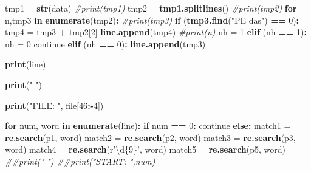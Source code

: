 \documentclass[
  12pt,
]{article}
\newenvironment{Shaded}{\begin{snugshade}}{\end{snugshade}}
\newcommand{\CommentTok}[1]{\textcolor[rgb]{0.56,0.35,0.01}{\textit{#1}}}
\newcommand{\ControlFlowTok}[1]{\textcolor[rgb]{0.13,0.29,0.53}{\textbf{#1}}}
\newcommand{\DecValTok}[1]{\textcolor[rgb]{0.00,0.00,0.81}{#1}}
\newcommand{\KeywordTok}[1]{\textcolor[rgb]{0.13,0.29,0.53}{\textbf{#1}}}
\newcommand{\NormalTok}[1]{#1}
\newcommand{\OperatorTok}[1]{\textcolor[rgb]{0.81,0.36,0.00}{\textbf{#1}}}
\newcommand{\StringTok}[1]{\textcolor[rgb]{0.31,0.60,0.02}{#1}}
\begin{document}
\begin{Shaded}
\begin{Highlighting}[]
\NormalTok{    tmp1 =}\StringTok{ }\KeywordTok{str}\NormalTok{(data)}
    \CommentTok{#print(tmp1)}
\NormalTok{    tmp2 =}\StringTok{ }\KeywordTok{tmp1.splitlines}\NormalTok{()}
    \CommentTok{#print(tmp2)}
    \ControlFlowTok{for}\NormalTok{ n,tmp3 }\ControlFlowTok{in} \KeywordTok{enumerate}\NormalTok{(tmp2)}\OperatorTok{:}
\StringTok{        }\CommentTok{#print(tmp3)}
\StringTok{        }\ControlFlowTok{if}\NormalTok{ (}\KeywordTok{tmp3.find}\NormalTok{(}\StringTok{"PE das"}\NormalTok{) }\OperatorTok{==}\StringTok{ }\DecValTok{0}\NormalTok{)}\OperatorTok{:}
\StringTok{            }\NormalTok{tmp4 =}\StringTok{ }\NormalTok{tmp3 }\OperatorTok{+}\StringTok{ }\NormalTok{tmp2[}\DecValTok{2}\NormalTok{]}
            \KeywordTok{line.append}\NormalTok{(tmp4)}
            \CommentTok{#print(n)}
\NormalTok{            nh =}\StringTok{ }\DecValTok{1}
        \KeywordTok{elif}\NormalTok{ (nh }\OperatorTok{==}\StringTok{ }\DecValTok{1}\NormalTok{)}\OperatorTok{:}
\StringTok{            }\NormalTok{nh =}\StringTok{ }\DecValTok{0}
\NormalTok{            continue}
        \KeywordTok{elif}\NormalTok{ (nh }\OperatorTok{==}\StringTok{ }\DecValTok{0}\NormalTok{)}\OperatorTok{:}
\StringTok{            }\KeywordTok{line.append}\NormalTok{(tmp3)}

    \KeywordTok{print}\NormalTok{(line)}

    \KeywordTok{print}\NormalTok{(}\StringTok{"   "}\NormalTok{)}
    
    \KeywordTok{print}\NormalTok{(}\StringTok{"FILE: "}\NormalTok{, file[}\DecValTok{46}\OperatorTok{:-}\DecValTok{4}\NormalTok{])}

    \ControlFlowTok{for}\NormalTok{ num, word }\ControlFlowTok{in} \KeywordTok{enumerate}\NormalTok{(line)}\OperatorTok{:}
\StringTok{            }\ControlFlowTok{if}\NormalTok{ num }\OperatorTok{==}\StringTok{ }\DecValTok{0}\OperatorTok{:}
\StringTok{                }\NormalTok{continue}
            \ControlFlowTok{else}\OperatorTok{:}
\StringTok{                }\NormalTok{match1 =}\StringTok{ }\KeywordTok{re.search}\NormalTok{(p1, word)}
\NormalTok{                match2 =}\StringTok{ }\KeywordTok{re.search}\NormalTok{(p2, word)}
\NormalTok{                match3 =}\StringTok{ }\KeywordTok{re.search}\NormalTok{(p3, word)}
\NormalTok{                match4 =}\StringTok{ }\KeywordTok{re.search}\NormalTok{(r}\StringTok{'\textbackslash{}d\{9\}'}\NormalTok{, word)}
\NormalTok{                match5 =}\StringTok{ }\KeywordTok{re.search}\NormalTok{(p5, word)}
                \CommentTok{##print("   ")}
                \CommentTok{##print("START: ",num)}


\end{Highlighting}
\end{Shaded}
\end{document}
